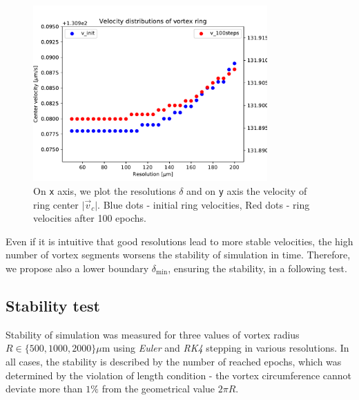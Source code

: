 \begin{figure}[h]
	\centering
	\includegraphics[width=0.8\textwidth]{graphics/results/vels_convergence}
	\caption{On \texttt{x} axis, we plot the resolutions $\delta$ and on \texttt{y} axis the velocity of ring center $\vert \vec{v}_c \vert $. Blue dots - initial ring velocities, Red dots - ring velocities after 100 epochs.}
\end{figure}

Even if it is intuitive that good resolutions lead to more stable velocities, the high number of vortex segments worsens the stability of simulation in time. Therefore, we propose also a lower boundary $\delta_{\text{min}}$, ensuring the stability, in a following test.

\subsection*{Stability test}

Stability of simulation was measured for three values of vortex radius $R \in \{500, 1000, 2000\} \mu\text{m}$ using \textit{Euler} and \textit{RK4} stepping in various resolutions. In all cases, the stability is described by the number of reached epochs, which was determined by the violation of length condition - the vortex circumference cannot deviate more than $1\%$ from the geometrical value $2\pi R$.

\newpage

